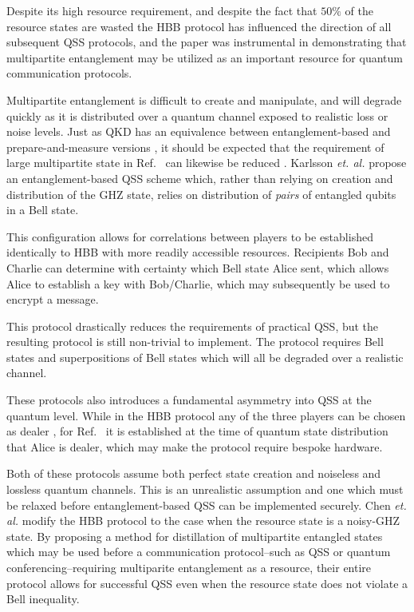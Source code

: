 Despite its high resource requirement, and despite the fact that $50\%$ of the resource states are wasted  the HBB protocol has influenced the direction of all subsequent QSS protocols, and the paper was instrumental in demonstrating that multipartite entanglement may be utilized as an important resource for quantum communication protocols. 

Multipartite entanglement is difficult to create and manipulate, and will degrade quickly as it is distributed over a quantum channel exposed to realistic loss or noise levels. Just as QKD has an equivalence between entanglement-based and prepare-and-measure versions , it should be expected that the requirement of large multipartite state in Ref.~\cite{Hillery1999} can likewise be reduced \cite{Karlsson1999, Tittel2001, Zhang2005b, Williams2019}. Karlsson \emph{et. al.} \cite{Karlsson1999} propose an entanglement-based QSS scheme which, rather than relying on creation and distribution of the GHZ state, relies on distribution of \emph{pairs} of entangled qubits in a Bell state. 

This configuration allows for correlations between players to be established identically to HBB with more readily accessible resources. Recipients Bob and Charlie can determine with certainty which Bell state Alice sent, which allows Alice to establish a key with Bob/Charlie, which may subsequently be used to encrypt a message. 

This protocol drastically reduces the requirements of practical QSS, but the resulting protocol is still non-trivial to implement. The protocol requires Bell states and superpositions of Bell states which will all be degraded over a realistic channel. 

These protocols also introduces a fundamental asymmetry into QSS at the quantum level. While in the HBB protocol any of the three players can be chosen as dealer , for Ref.~\cite{Karlsson1999} it is established at the time of quantum state distribution that Alice is dealer, which may make the protocol require bespoke hardware.

Both of these protocols \cite{Hillery1999, Karlsson1999} assume both perfect state creation and noiseless and lossless quantum channels. This is an unrealistic assumption and one which must be relaxed before entanglement-based QSS can be implemented securely. Chen \emph{et. al.} \cite{Chen2005a} modify the HBB protocol to the case when the resource state is a noisy-GHZ state. By proposing a method for distillation of multipartite entangled states which may be used before a communication protocol--such as QSS or quantum conferencing--requiring multiparite entanglement as a resource, their entire protocol allows for successful QSS even when the resource state does not violate a Bell inequality.


